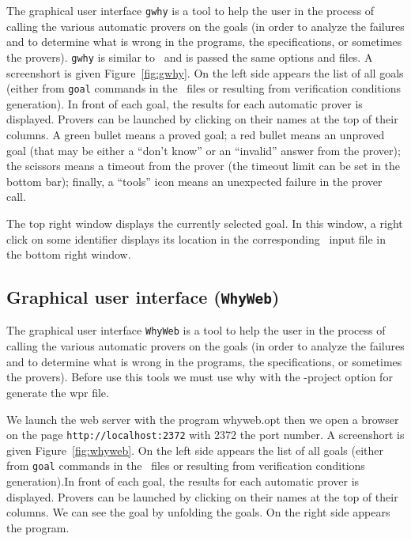 \documentclass[a4paper,12pt]{report}
\begin{document}
The graphical user interface \texttt{gwhy} is a tool to help the user
in the process of calling the various automatic provers on the goals
(in order to analyze the failures and to determine what is wrong in
the programs, the specifications, or sometimes the provers).
\texttt{gwhy} is similar to \why\
and is passed the same options and files. A screenshort is given
Figure~\ref{fig:gwhy}. On the left side appears the list of all goals
(either from \texttt{goal} commands in the \why\ files or resulting
from verification conditions generation). In front of each goal, the
results for each automatic prover is displayed. Provers can be
launched by clicking on their names at the top of their columns.
A green bullet means a proved goal; a red bullet means an unproved
goal (that may be either a ``don't know'' or an ``invalid'' answer
from the prover); the scissors means a timeout from the prover (the
timeout limit can be set in the bottom bar); finally, a ``tools'' icon
means an unexpected failure in the prover call.

The top right window displays the currently selected goal.
In this window, a right click on some identifier displays its location
in the corresponding \why\ input file in the bottom right window.


\subsection{Graphical user interface (\texttt{WhyWeb})}

The graphical user interface \texttt{WhyWeb} is a tool to help the user
in the process of calling the various automatic provers on the goals
(in order to analyze the failures and to determine what is wrong in
the programs, the specifications, or sometimes the provers).
Before use this tools we must use why with the -project option for
generate the wpr file. 

We launch the web server with the program whyweb.opt then we open a
browser on the page \texttt{http://localhost:2372} with 2372 the port
number. A screenshort is given Figure~\ref{fig:whyweb}.  On the left
side appears the list of all goals (either from \texttt{goal} commands
in the \why\ files or resulting from verification conditions
generation).In front of each goal, the results for each automatic
prover is displayed. Provers can be launched by clicking on their
names at the top of their columns. We can see the goal by unfolding
the goals. On the right side appears the program.
\end{document}
